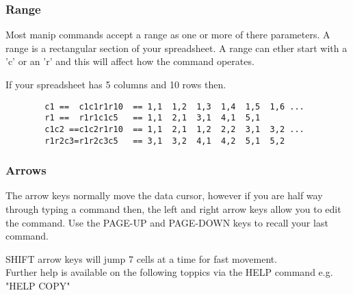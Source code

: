 \subsubsection{Range}
Most manip commands accept a range as one or more of there
parameters.  A range is a rectangular section of your
spreadsheet.  A range can ether start with a 'c' or an
'r' and this will affect how the command operates.

If your spreadsheet has 5 columns and 10 rows then.
\begin{verbatim}
		c1 ==  c1c1r1r10  == 1,1  1,2  1,3  1,4  1,5  1,6 ...
		r1 ==  r1r1c1c5   == 1,1  2,1  3,1  4,1  5,1
		c1c2 ==c1c2r1r10  == 1,1  2,1  1,2  2,2  3,1  3,2 ...
		r1r2c3=r1r2c3c5   == 3,1  3,2  4,1  4,2  5,1  5,2
\end{verbatim}

\subsubsection{Arrows}
The arrow keys normally move the data cursor, however if you are half
way through typing a command then, the left and right arrow keys allow you
to edit the command.  Use the {\sf PAGE-UP} and {\sf PAGE-DOWN} keys to recall
your last command.

{\sf SHIFT} arrow keys will jump 7 cells at a time for fast movement.\\

Further help is available on the following toppics via
the HELP command e.g. "HELP COPY"

